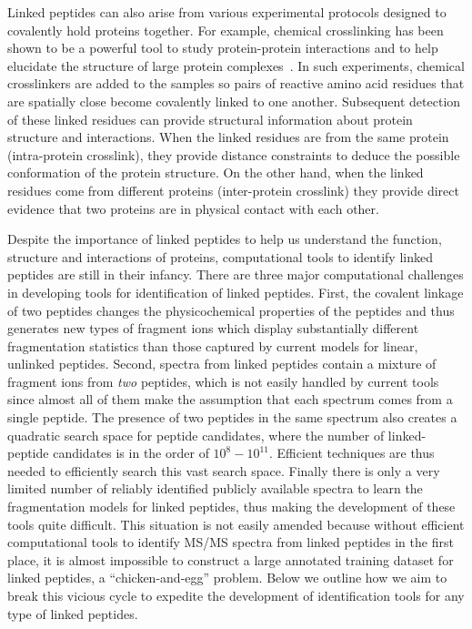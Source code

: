 \documentclass[arial,11pt]{article}
\begin{document}
Linked peptides can also arise from various experimental protocols designed to covalently hold proteins together. For example, chemical crosslinking has been shown to be a powerful tool to study protein-protein interactions and to help elucidate the structure of large protein complexes~\cite{Sinz06,stengel2012joining,herzog2012structural}. In such experiments, chemical crosslinkers are added to the samples so pairs of reactive amino acid residues that are spatially close become covalently linked to one another.  Subsequent detection of these linked residues can provide structural information about protein structure and interactions. When the linked residues are from the same protein (intra-protein crosslink), they provide distance constraints to deduce the possible conformation of the protein structure. On the other hand, when the linked residues come from different proteins (inter-protein crosslink) they provide direct evidence that two proteins are in physical contact with each other.

Despite the importance of linked peptides to help us understand the function, structure and interactions of proteins, computational tools to identify linked peptides are still in their infancy.  There are three major computational challenges in developing tools for identification of linked peptides.
%
First, the covalent linkage of two peptides changes the physicochemical properties of the peptides and thus generates new types of fragment ions which display substantially different fragmentation statistics than those captured by current models for linear, unlinked peptides.
%
Second, spectra from linked peptides contain a mixture of fragment ions from \emph{two} peptides, which is not easily handled by current tools since almost all of them make the assumption that each spectrum comes from a single peptide. The presence of two peptides in the same spectrum also creates a quadratic search space for peptide candidates, where the number of linked-peptide candidates is in the order of $10^{8}-10^{11}$. Efficient techniques are thus needed to efficiently search this vast search space.
%
Finally there is only a very limited number of reliably identified publicly available spectra to learn the fragmentation models for linked peptides, thus making the development of these tools quite difficult. This situation is not easily amended because without efficient computational tools to identify MS/MS spectra from linked peptides in the first place, it is almost impossible to construct a large annotated training dataset for linked peptides, a ``chicken-and-egg'' problem.  Below we outline how we aim to break this vicious cycle to expedite the development of identification tools for any type of linked peptides.
\end{document}
